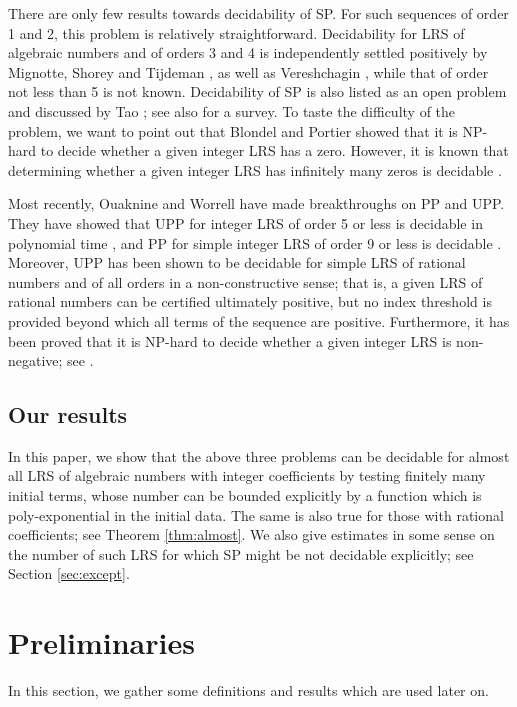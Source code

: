 \documentclass[12pt]{amsart}
\theoremstyle{definition}
\theoremstyle{remark}
\numberwithin{equation}{section}
\begin{document}
There are only few results towards decidability of SP. For such sequences of order
1 and 2, this problem is relatively straightforward.
Decidability for LRS of algebraic numbers and of orders 3 and 4 is
independently settled positively by Mignotte, Shorey and Tijdeman \cite{MST}, as well as Vereshchagin \cite{Ver}, while that of order not less than 5 is not known. Decidability of SP is
also listed as an open problem and discussed by Tao \cite[Section 1.9]{Tao}; see also \cite{HHHK} for a survey. To taste the difficulty of the problem, we want to point out that Blondel and Portier \cite[Corollary 2.1]{BP} showed that it is NP-hard to decide whether a given integer LRS has a zero. However, it is known that determining whether a given integer LRS has infinitely many zeros is decidable \cite{BM}.

Most recently, Ouaknine and Worrell have made breakthroughs on PP and UPP. They have showed that UPP for integer LRS of order 5 or less is decidable in polynomial time \cite{OW14a}, and PP for
simple integer LRS of order 9 or less is decidable \cite{OW14b}. Moreover, UPP has been shown to be decidable for simple LRS of rational numbers and of all orders \cite{OW14c} in a non-constructive sense; that is, a given LRS of rational numbers can be certified ultimately positive, but no index threshold is provided beyond which all terms of the sequence are positive. Furthermore, it has been proved that it is NP-hard to decide whether a given integer LRS is non-negative; see \cite[Theorem 1]{BDJB}.

\subsection{Our results}

In this paper, we show that the above three problems can be decidable for almost all LRS of algebraic numbers with integer coefficients by testing finitely many initial terms, whose number can be bounded explicitly by a function which is poly-exponential in the initial data. The same is also true for those with rational coefficients; see Theorem \ref{thm:almost}. We also give estimates in some sense on the number of such LRS for which SP might be not decidable explicitly; see Section \ref{sec:except}.

\section{Preliminaries}

In this section, we gather some definitions and results which are used later on.
\end{document}
